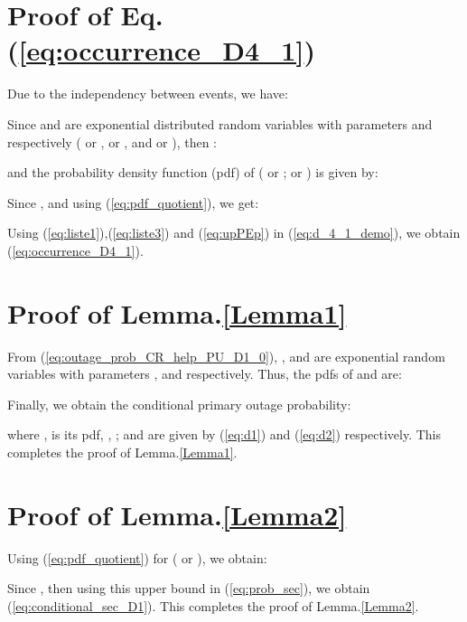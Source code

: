 \documentclass[conference,twocolumn]{IEEEtran}
\begin{document}
\appendices
\section{Proof of Eq.(\ref{eq:occurrence_D4_1})}
Due to the independency between events, we have:

Since  and  are exponential distributed random variables with parameters  and  respectively ( or ,  or , and  or ), then :

and the probability density function (pdf) of  ( or ;  or ) is given by:

Since ,  and using (\ref{eq:pdf_quotient}), we get:


Using (\ref{eq:liste1}),(\ref{eq:liste3}) and (\ref{eq:upPEp}) in (\ref{eq:d_4_1_demo}), we obtain (\ref{eq:occurrence_D4_1}).


\section{Proof of Lemma.\ref{Lemma1}}
From (\ref{eq:outage_prob_CR_help_PU_D1_0}), , 
and  are exponential random variables with parameters ,
 and
 respectively. Thus, the
pdfs of  and
 are:

Finally, we obtain the conditional primary outage probability:

where ,  is its pdf, , ;  and  are given by (\ref{eq:d1}) and (\ref{eq:d2}) respectively. This completes the proof of Lemma.\ref{Lemma1}.

\section{Proof of Lemma.\ref{Lemma2}}
Using (\ref{eq:pdf_quotient}) for  ( or ), we obtain:

Since , then using this upper bound in (\ref{eq:prob_sec}), we obtain (\ref{eq:conditional_sec_D1}).
This completes the proof of Lemma.\ref{Lemma2}.




\end{document}
